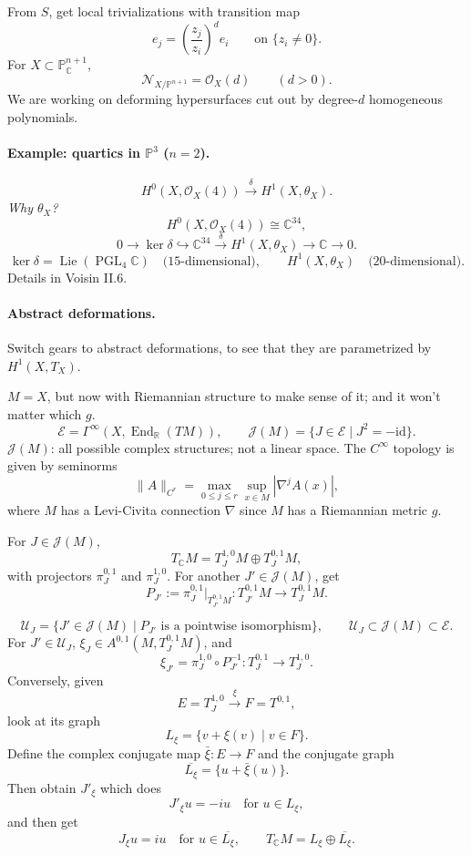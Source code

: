\documentclass[11pt]{article}
\newcommand{\C}{\mathbb C}
\newcommand{\R}{\mathbb R}
\newcommand{\PP}{\mathbb P}
\newcommand{\OO}{\mathcal O}
\newcommand{\JJ}{\mathcal J}
\newcommand{\EE}{\mathcal E}
\newcommand{\UU}{\mathcal U}
\newcommand{\NN}{\mathcal N}
\newcommand{\id}{\mathrm{id}}
\DeclareMathOperator{\End}{End}
\DeclareMathOperator{\Lie}{Lie}
\DeclareMathOperator{\PGL}{PGL}
\begin{document}
From $S$, get local trivializations with transition map
\[
 e_j=\left(\frac{z_j}{z_i}\right)^d e_i
 \qquad\text{on }\{z_i\neq0\}.
\]
For $X\subset\PP^{n+1}_{\C}$,
\[
 \NN_{X/\PP^{n+1}}=\OO_X(d)\qquad(d>0).
\]
We are working on deforming hypersurfaces cut out by degree-$d$
homogeneous polynomials.

\paragraph{Example: quartics in $\PP^3$ ($n=2$).}
\[
 H^0(X,\OO_X(4))\xrightarrow{\delta}H^1(X,\theta_X).
\]
\textit{Why $\theta_X$?}
\[
 H^0(X,\OO_X(4))\cong\C^{34},
\]
\[
 0\longrightarrow\ker\delta\hookrightarrow\C^{34}
 \xrightarrow{\delta}H^1(X,\theta_X)\longrightarrow\C\longrightarrow0.
\]
\[
 \ker\delta=\Lie(\PGL_4\C)\quad\text{(15-dimensional)},
 \qquad H^1(X,\theta_X)\quad\text{(20-dimensional)}.
\]
Details in Voisin II.6.

\paragraph{Abstract deformations.}
Switch gears to abstract deformations, to see that they are parametrized
by $H^1(X,T_X)$.

$M=X$, but now with Riemannian structure to make sense of it; and it
won't matter which $g$.
\[
 \EE=\Gamma^{\infty}(X,\End_{\R}(TM)),
 \qquad
 \JJ(M)=\{J\in\EE\mid J^2=-\id\}.
\]
$\JJ(M)$: all possible complex structures; not a linear space.
The $C^{\infty}$ topology is given by seminorms
\[
 \|A\|_{C^r}=\max_{0\leq j\leq r}\sup_{x\in M}
 |\nabla^j A(x)|,
\]
where $M$ has a Levi-Civita connection $\nabla$ since $M$ has a
Riemannian metric $g$.

For $J\in\JJ(M)$,
\[
 T_{\C}M=T_J^{1,0}M\oplus T_J^{0,1}M,
\]
with projectors $\pi_J^{0,1}$ and $\pi_J^{1,0}$.
For another $J'\in\JJ(M)$, get
\[
 P_{J'}:=\pi_J^{0,1}|_{T_{J'}^{0,1}M}:
 T_{J'}^{0,1}M\longrightarrow T_J^{0,1}M.
\]

\[
 \UU_J=\{J'\in\JJ(M)\mid P_{J'}\text{ is a pointwise isomorphism}\},
 \qquad\UU_J\subset\JJ(M)\subset\EE.
\]
For $J'\in\UU_J$, $\xi_J\in A^{0,1}(M,T_J^{0,1}M)$, and
\[
 \xi_{J'}=\pi_J^{1,0}\circ P_{J'}^{-1}:
 T_J^{0,1}\longrightarrow T_J^{1,0}.
\]
Conversely, given
\[
 E=T_J^{1,0}\xrightarrow{\xi}F=T^{0,1},
\]
look at its graph
\[
 L_{\xi}=\{v+\xi(v)\mid v\in F\}.
\]
Define the complex conjugate map $\bar\xi:E\longrightarrow F$ and the
conjugate graph
\[
 \overline{L_{\xi}}=\{u+\bar\xi(u)\}.
\]
Then obtain $J'_{\xi}$ which does
\[
 J'_{\xi}u=-iu\quad\text{for }u\in L_{\xi},
\]
and then get
\[
 J_{\xi}u=iu\quad\text{for }u\in\overline{L_{\xi}},
 \qquad T_{\C}M=L_{\xi}\oplus\overline{L_{\xi}}.
\]
\end{document}
